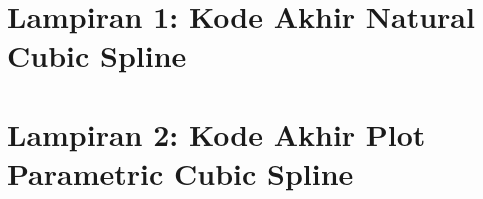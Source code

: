 \chapter*{Lampiran 1: Kode Akhir Natural Cubic Spline}
\label{appendix:naturalCubicSpline}


\chapter*{Lampiran 2: Kode Akhir Plot Parametric Cubic Spline}
\label{appendix:naturalCubicSpline}



